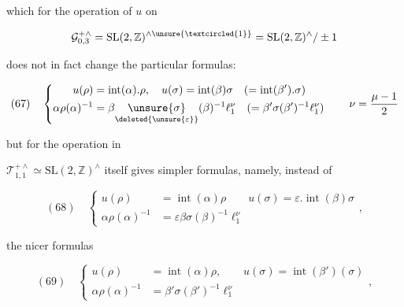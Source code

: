 which  for the operation of $u$ on

\[
\mathcal G_{0,3}^{+\wedge}
=\mathrm{SL}(2,\mathbb Z)^{\wedge\unsure{\textcircled{1}}}
=\mathrm{SL}(2,\mathbb Z)^{\wedge}/\pm1
\]

does not in fact change the particular formulas:

\[
(67)\quad\left\{\begin{aligned}
u(\rho)&=\operatorname{int}(\alpha).\rho,\quad
u(\sigma)=\operatorname{int}(\beta)\sigma
\quad(=\operatorname{int}(\beta').\sigma)\\
\alpha\rho(\alpha)^{-1}
&=\beta\underset{\deleted{\unsure{\varepsilon}}}{\unsure{\sigma}}(\beta)^{-1}\ell_1^\nu
\quad(=\beta'\sigma(\beta')^{-1}\ell_1^\nu)
\end{aligned}\right.
\qquad\nu=\frac{\mu-1}{2}
\]




but for the operation in

$\mathcal T_{1,1}^{+\wedge}\simeq\mathrm{SL}(2,\mathbb Z)^{\wedge}$
itself gives simpler formulas, namely, instead of

\[
(68)\quad\left\{\begin{aligned}
u(\rho)&=\operatorname{int}(\alpha)\rho\qquad
u(\sigma)=\varepsilon.\operatorname{int}(\beta)\sigma\\
\alpha\rho(\alpha)^{-1}&=\varepsilon\beta\sigma(\beta)^{-1}\ell_1^\nu
\end{aligned}\right.,
\]

the nicer formulas

\[
(69)\quad\left\{\begin{aligned}
u(\rho)&=\operatorname{int}(\alpha)\rho,\qquad
u(\sigma)=\operatorname{int}(\beta')(\sigma)\\
\alpha\rho(\alpha)^{-1}&=\beta'\sigma(\beta')^{-1}\ell_1^\nu
\end{aligned}\right.,
\]

